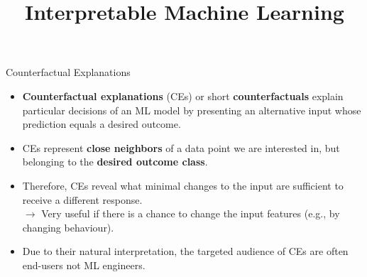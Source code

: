 \documentclass[11pt,compress,t,notes=noshow, aspectratio=169, xcolor=table]{beamer}
\title{Interpretable Machine Learning}
\date{}
\begin{document}
	




 \newcommand{\titlefigure}{figure/counterfactuals_obj}
\newcommand{\learninggoals}{
\item Understand the motivation behind CEs
\item See the mathematical foundation of CEs}



\begin{vbframe}{Counterfactual Explanations}
	\begin{itemize}
	    \item \textbf{Counterfactual explanations} (CEs) or short \textbf{counterfactuals} explain particular decisions of an ML model by presenting an alternative input whose prediction equals a desired outcome.
		\item CEs represent \textbf{close neighbors} of a data point we are interested in, but belonging to the \textbf{desired outcome class}. 
		\item Therefore, CEs reveal what minimal changes to the input are sufficient to receive a different response.\\
		$\rightarrow$ Very useful if there is a chance to change the input features (e.g., by changing behaviour).
		\item Due to their natural interpretation, the targeted audience of CEs are often end-users not ML engineers.
	\end{itemize}
\end{vbframe}
\end{document}
